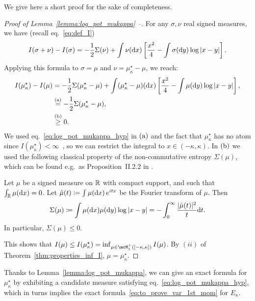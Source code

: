 We give here a short proof for the sake of completeness.
\begin{proof}[Proof of Lemma~\ref{lemma:log_pot_mukappa} --]
    For any $\sigma, \nu$ real signed measures, we have (recall eq.~\eqref{eq:def_I}) 
    \begin{equation*}
        I(\sigma + \nu) - I(\sigma) = -\frac{1}{2} \Sigma(\nu) + \int \nu(\mathrm{d} x) \left[\frac{x^2}{4} - \int \sigma(\mathrm{d} y) \log |x - y|\right]. 
    \end{equation*}
    Applying this formula to $\sigma = \mu$ and $\nu = \mu_\kappa^\star - \mu$, we reach:
    \begin{align*}
        I(\mu_\kappa^\star) - I(\mu) &= -\frac{1}{2} \Sigma(\mu_\kappa^\star - \mu) + \int (\mu_\kappa^\star - \mu)(\mathrm{d} x) \left[\frac{x^2}{4} - \int \mu(\mathrm{d} y) \log |x - y|\right], \\ 
         &\overset{\mathrm{(a)}}{=} -\frac{1}{2} \Sigma(\mu_\kappa^\star - \mu), \\ 
         &\overset{\mathrm{(b)}}{\geq} 0.
    \end{align*}
    We used eq.~\eqref{eq:log_pot_mukappa_hyp} in $(\rm a)$ and the fact that $\mu_\kappa^\star$ has no atom since $I(\mu_\kappa^\star) < \infty$~\citep{arous1997large}, so we can restrict the integral 
    to $x \in (-\kappa,\kappa)$.
    In $(\rm b)$ we used the following classical property of the non-commutative entropy $\Sigma(\mu)$, 
    which can be found e.g.\ as Proposition~II.2.2 in \cite{faraut2014logarithmic}.
    \begin{lemma}\label{lemma:nonc_entropy_pos}
        Let $\mu$ be a signed measure on $\mathbb{R}$ with compact support, and such that $\int_{\mathbb{R}} \mu(\mathrm{d} x) = 0$. 
        Let $\hat{\mu}(t) \coloneqq \int \mu(\mathrm{d} x) \, e^{i t x}$ be the Fourier transform of $\mu$.
        Then 
        \begin{equation*}
            \Sigma(\mu) \coloneqq \int \mu(\mathrm{d} x) \mu(\mathrm{d} y) \log |x - y| = - \int_0^\infty \frac{|\hat{\mu}(t)|^2}{t} \mathrm{d} t.
        \end{equation*}
        In particular, $\Sigma(\mu) \leq 0$.
    \end{lemma}
    \noindent
    This shows that $I(\mu) \leq I(\mu_\kappa^\star) = \inf_{\mu \in \mcM_1^+([-\kappa,\kappa])} I(\mu)$. By $(ii)$ of Theorem~\ref{thm:properties_inf_I}, $\mu = \mu_\kappa^\star$.
\end{proof}
\noindent
Thanks to Lemma~\ref{lemma:log_pot_mukappa}, we can give an exact formula for $\mu_\kappa^\star$ by exhibiting a candidate measure satisfying eq.~\eqref{eq:log_pot_mukappa_hyp}, which in turns implies the exact formula~\eqref{eq:to_prove_var_1st_mom} for $E_\kappa$.
